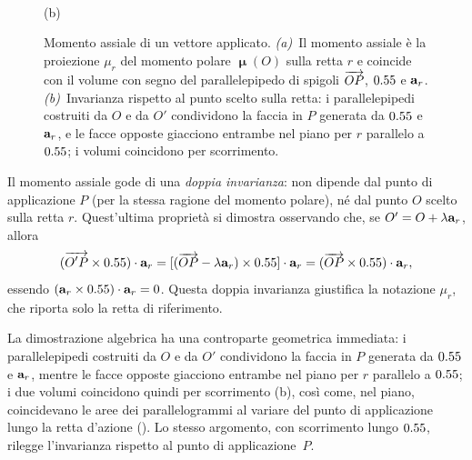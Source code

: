 \begin{figure}[!htbp]
\begin{minipage}[b]{0.54\linewidth}
\\[4pt]
		{\small (b)}
	\end{minipage}
	\caption[Momento assiale di un vettore applicato]{Momento assiale
		di un vettore applicato.
		\textit{(a)}~Il momento assiale è la proiezione $\mu_r$ del momento
		polare $\bm{\upmu}(O)$ sulla retta $r$ e coincide con il volume con
		segno del parallelepipedo di spigoli $\protect\overrightarrow{OP}$,
		$0.55$ e $\mathbf{a}_r$.
		\textit{(b)}~Invarianza rispetto al punto scelto sulla retta: i
		parallelepipedi costruiti da $O$ e da $O'$ condividono la faccia
		in $P$ generata da $0.55$ e $\mathbf{a}_r$, e le facce opposte giacciono
		entrambe nel piano per $r$ parallelo a $0.55$; i volumi coincidono
		per scorrimento.}
	\label{f:momento_assiale}
\end{figure}


Il momento assiale gode di una \textit{doppia invarianza}: non dipende
dal punto di applicazione $P$ (per la stessa ragione del momento
polare), né dal punto $O$ scelto sulla retta $r$. Quest'ultima
proprietà si dimostra osservando che, se $O' = O + \lambda\mathbf{a}_r$,
allora
\begin{equation}
	(\overrightarrow{O'P} \times 0.55) \cdot \mathbf{a}_r
	= [(\overrightarrow{OP} - \lambda\mathbf{a}_r) \times 0.55] \cdot \mathbf{a}_r
	= (\overrightarrow{OP} \times 0.55) \cdot \mathbf{a}_r,
\end{equation}
essendo $(\mathbf{a}_r \times 0.55) \cdot \mathbf{a}_r = 0$. Questa doppia invarianza
giustifica la notazione $\mu_r$, che riporta solo la retta di
riferimento.

La dimostrazione algebrica ha una controparte geometrica immediata:
i parallelepipedi costruiti da $O$ e da $O'$ condividono la faccia
in $P$ generata da $0.55$ e $\mathbf{a}_r$, mentre le facce opposte giacciono
entrambe nel piano per $r$ parallelo a $0.55$; i due volumi coincidono
quindi per scorrimento (b), così come, nel
piano, coincidevano le aree dei parallelogrammi al variare del punto
di applicazione lungo la retta d'azione
(). Lo stesso argomento, con
scorrimento lungo $0.55$, rilegge l'invarianza rispetto al punto di
applicazione~$P$.


